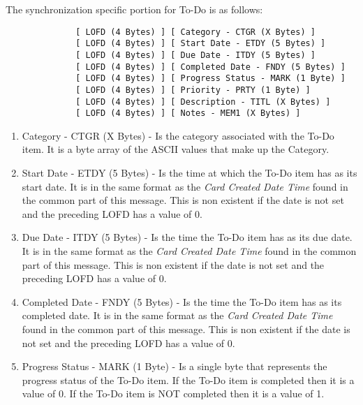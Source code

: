             The synchronization specific portion for To-Do is as follows:

            \begin{verbatim}
              [ LOFD (4 Bytes) ] [ Category - CTGR (X Bytes) ]
              [ LOFD (4 Bytes) ] [ Start Date - ETDY (5 Bytes) ]
              [ LOFD (4 Bytes) ] [ Due Date - ITDY (5 Bytes) ]
              [ LOFD (4 Bytes) ] [ Completed Date - FNDY (5 Bytes) ]
              [ LOFD (4 Bytes) ] [ Progress Status - MARK (1 Byte) ]
              [ LOFD (4 Bytes) ] [ Priority - PRTY (1 Byte) ]
              [ LOFD (4 Bytes) ] [ Description - TITL (X Bytes) ]
              [ LOFD (4 Bytes) ] [ Notes - MEM1 (X Bytes) ]
            \end{verbatim}

            \begin{enumerate}
              \item Category - CTGR (X Bytes) - Is the category associated
              with the To-Do item. It is a byte array of the ASCII values that
              make up the Category.

              \item Start Date - ETDY (5 Bytes) - Is the time at which the
              To-Do item has as its start date. It is in the same format as the
              \emph{Card Created Date Time} found in the common part of this
              message. This is non existent if the date is not set and the
              preceding LOFD has a value of 0.

              \item Due Date - ITDY (5 Bytes) - Is the time the To-Do item has
              as its due date. It is in the same format as the
              \emph{Card Created Date Time} found in the common part of this
              message. This is non existent if the date is not set and the
              preceding LOFD has a value of 0.

              \item Completed Date - FNDY (5 Bytes) - Is the time the To-Do
              item has as its completed date. It is in the same format as the
              \emph{Card Created Date Time} found in the common part of this
              message. This is non existent if the date is not set and the
              preceding LOFD has a value of 0.

              \item Progress Status - MARK (1 Byte) - Is a single byte that
              represents the progress status of the To-Do item. If the To-Do
              item is completed then it is a value of 0. If the To-Do item is
              NOT completed then it is a value of 1.


\end{enumerate}
